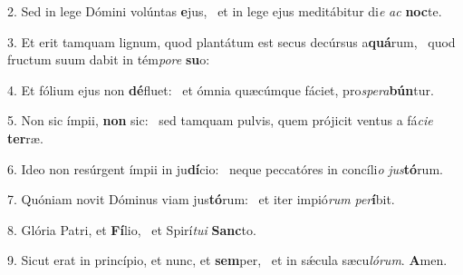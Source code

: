 2. Sed in lege Dómini volúntas \textbf{e}jus, \ast\  et in lege ejus meditábitur di\textit{e} \textit{ac} \textbf{noc}te.\

3. Et erit tamquam lignum, quod plantátum est secus decúrsus a\textbf{quá}rum, \ast\  quod fructum suum dabit in tém\textit{po}\textit{re} \textbf{su}o:\

4. Et fólium ejus non \textbf{dé}fluet: \ast\  et ómnia quæcúmque fáciet, pro\textit{spe}\textit{ra}\textbf{bún}tur.\

5. Non sic ímpii, \textbf{non} sic: \ast\  sed tamquam pulvis, quem prójicit ventus a fá\textit{ci}\textit{e} \textbf{ter}ræ.\

6. Ideo non resúrgent ímpii in ju\textbf{dí}cio: \ast\  neque peccatóres in concíli\textit{o} \textit{jus}\textbf{tó}rum.\

7. Quóniam novit Dóminus viam jus\textbf{tó}rum: \ast\  et iter impió\textit{rum} \textit{per}\textbf{í}bit.\

8. Glória Patri, et \textbf{Fí}lio, \ast\  et Spirí\textit{tu}\textit{i} \textbf{Sanc}to.\

9. Sicut erat in princípio, et nunc, et \textbf{sem}per, \ast\  et in sǽcula sæcu\textit{ló}\textit{rum}. \textbf{A}men.\

